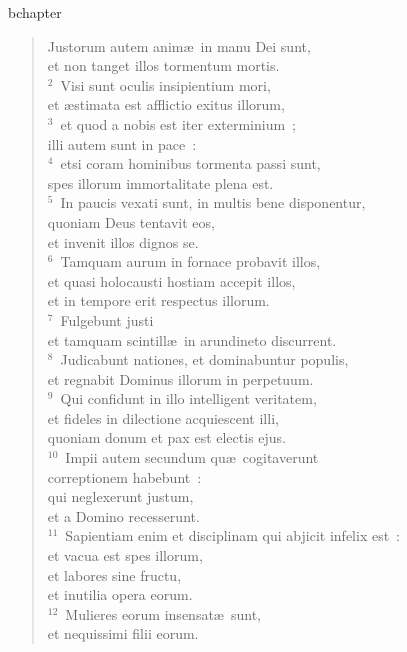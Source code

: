 bchapter\begin{flushleft}\begin{verse}\vspace{-19pt}Justorum autem anim\ae\ in manu Dei sunt,\\ et non tanget illos tormentum mortis.\\
${}^{2}$~Visi sunt oculis insipientium mori,\\ et \ae stimata est afflictio exitus illorum,\\
${}^{3}$~et quod a nobis est iter exterminium~;\\ illi autem sunt in pace~:\\
${}^{4}$~etsi coram hominibus tormenta passi sunt,\\ spes illorum immortalitate plena est.\\
${}^{5}$~In paucis vexati sunt, in multis bene disponentur,\\ quoniam Deus tentavit eos,\\ et invenit illos dignos se.\\
${}^{6}$~Tamquam aurum in fornace probavit illos,\\ et quasi holocausti hostiam accepit illos,\\ et in tempore erit respectus illorum.\\
${}^{7}$~Fulgebunt justi\\ et tamquam scintill\ae\ in arundineto discurrent.\\
${}^{8}$~Judicabunt nationes, et dominabuntur populis,\\ et regnabit Dominus illorum in perpetuum.\\
${}^{9}$~Qui confidunt in illo intelligent veritatem,\\ et fideles in dilectione acquiescent illi,\\ quoniam donum et pax est electis ejus.\\
${}^{10}$~Impii autem secundum qu\ae\ cogitaverunt\\ correptionem habebunt~:\\ qui neglexerunt justum,\\ et a Domino recesserunt.\\
${}^{11}$~Sapientiam enim et disciplinam qui abjicit infelix est~:\\ et vacua est spes illorum,\\ et labores sine fructu,\\ et inutilia opera eorum.\\
${}^{12}$~Mulieres eorum insensat\ae\ sunt,\\ et nequissimi filii eorum.\\

\end{verse}
\end{flushleft}
